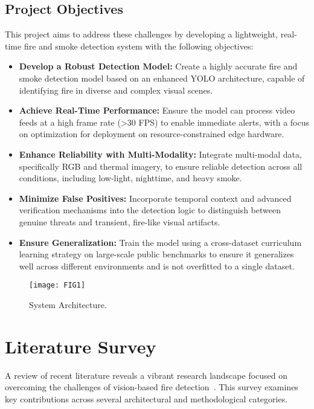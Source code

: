 \documentclass[12pt,a4paper]{article}
\begin{document}
\subsection{Project Objectives}
This project aims to address these challenges by developing a lightweight, real-time fire and smoke detection system with the following objectives:
\begin{itemize}
  \item \textbf{Develop a Robust Detection Model:} Create a highly accurate fire and smoke detection model based on an enhanced YOLO architecture, capable of identifying fire in diverse and complex visual scenes.
  \item \textbf{Achieve Real-Time Performance:} Ensure the model can process video feeds at a high frame rate (>30 FPS) to enable immediate alerts, with a focus on optimization for deployment on resource-constrained edge hardware.
  \item \textbf{Enhance Reliability with Multi-Modality:} Integrate multi-modal data, specifically RGB and thermal imagery, to ensure reliable detection across all conditions, including low-light, nighttime, and heavy smoke.
  \item \textbf{Minimize False Positives:} Incorporate temporal context and advanced verification mechanisms into the detection logic to distinguish between genuine threats and transient, fire-like visual artifacts.
  \item \textbf{Ensure Generalization:} Train the model using a cross-dataset curriculum learning strategy on large-scale public benchmarks to ensure it generalizes well across different environments and is not overfitted to a single dataset.
\end{itemize}

\begin{figure}[h]
  \centering
  \texttt{[image: FIG1]}
  \caption{System Architecture.}
\end{figure}

\section{Literature Survey}
A review of recent literature reveals a vibrant research landscape focused on overcoming the challenges of vision-based fire detection~\cite{ismail2025survey}. This survey examines key contributions across several architectural and methodological categories.
\end{document}
